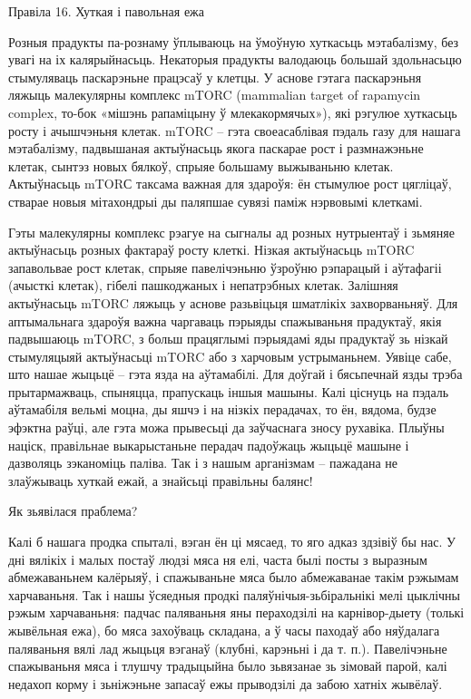 Правіла 16. Хуткая і павольная ежа

Розныя прадукты па-рознаму ўплываюць на ўмоўную хуткасьць мэтабалізму, без увагі на іх калярыйнасьць. Некаторыя прадукты валодаюць большай здольнасьцю стымуляваць паскарэньне працэсаў у клетцы. У аснове гэтага паскарэньня ляжыць малекулярны комплекс mTORC (mammalian target of rapamycin complex, то-бок «мішэнь рапаміцыну ў млекакормячых»), які рэгулюе хуткасьць росту і ачышчэньня клетак.
mTORC – гэта своеасаблівая пэдаль газу для нашага мэтабалізму, падвышаная актыўнасьць якога паскарае рост і размнажэньне клетак, сынтэз новых бялкоў, спрыяе большаму выжываньню клетак. Актыўнасьць mTORС таксама важная для здароўя: ён стымулюе рост цягліцаў, стварае новыя мітахондрыі ды паляпшае сувязі паміж нэрвовымі клеткамі.

Гэты малекулярны комплекс рэагуе на сыгналы ад розных нутрыентаў і зьмяняе актыўнасьць розных фактараў росту клеткі. Нізкая актыўнасьць mTORC запавольвае рост клетак, спрыяе павелічэньню ўзроўню рэпарацый і аўтафагіі (ачысткі клетак), гібелі пашкоджаных і непатрэбных клетак. Залішняя актыўнасьць mTORC ляжыць у аснове разьвіцьця шматлікіх захворваньняў. Для аптымальнага здароўя важна чаргаваць пэрыяды спажываньня прадуктаў, якія падвышаюць mTORC, з больш працяглымі пэрыядамі яды прадуктаў зь нізкай стымуляцыяй актыўнасьці mTORC або з харчовым устрыманьнем.
Уявіце сабе, што нашае жыцьцё – гэта язда на аўтамабілі. Для доўгай і бясьпечнай язды трэба прытармажваць, спыняцца, прапускаць іншыя машыны. Калі ціснуць на пэдаль аўтамабіля вельмі моцна, ды яшчэ і на нізкіх перадачах, то ён, вядома, будзе эфэктна раўці, але гэта можа прывесьці да заўчаснага зносу рухавіка. Плыўны націск, правільнае выкарыстаньне перадач падоўжаць жыцьцё машыне і дазволяць зэканоміць паліва. Так і з нашым арганізмам – пажадана не злаўжываць хуткай ежай, а знайсьці правільны балянс!

Як зьявілася праблема?

Калі б нашага продка спыталі, вэган ён ці мясаед, то яго адказ здзівіў бы нас. У дні вялікіх і малых постаў людзі мяса ня елі, часта былі посты з выразным абмежаваньнем калёрыяў, і спажываньне мяса было абмежаванае такім рэжымам харчаваньня. Так і нашы ўсяедныя продкі паляўнічыя-зьбіральнікі мелі цыклічны рэжым харчаваньня: падчас паляваньня яны пераходзілі на карнівор-дыету (толькі жывёльная ежа), бо мяса захоўваць складана, а ў часы паходаў або няўдалага паляваньня вялі лад жыцьця вэганаў (клубні, карэньні і да т. п.). Павелічэньне спажываньня мяса і тлушчу традыцыйна было зьвязанае зь зімовай парой, калі недахоп корму і зьніжэньне запасаў ежы прыводзілі да забою хатніх жывёлаў.


